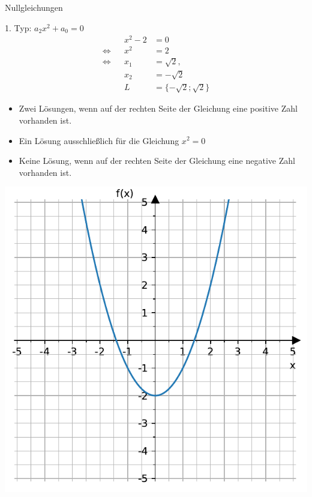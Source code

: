 \documentclass[
  ignorenonframetext,
  aspectratio=169,
]{beamer}
\providecommand{\tightlist}{%
  \setlength{\itemsep}{0pt}\setlength{\parskip}{0pt}}\usepackage{longtable,booktabs,array}
\begin{document}
\begin{frame}
\begin{block}{Nullgleichungen}
\label{nullgleichungen}
\begin{block}{1. Typ: \(a_2x^2+a_0= 0\)}
\label{typ-a_2x2a_0-0}
\[ \begin{aligned}
&& x^2-2 &= 0\\
\Leftrightarrow && x^2 &= 2\\
\Leftrightarrow && x_1 &= \sqrt{2},\\
 && x_2 &=-\sqrt{2}\\
 && L &= \{-\sqrt{2}; \sqrt{2} \}
\end{aligned}
\]

\begin{itemize}
\tightlist
\item
  Zwei Lösungen, wenn auf der rechten Seite der Gleichung eine positive
  Zahl vorhanden ist.
\item
  Ein Lösung ausschließlich für die Gleichung \(x^2=0\)
\item
  Keine Lösung, wenn auf der rechten Seite der Gleichung eine negative
  Zahl vorhanden ist.
\end{itemize}
\end{block}
\end{block}
\end{frame}

\begin{frame}
\includegraphics{3_Gleichungen_files/figure-beamer/cell-2-output-1.pdf}
\end{frame}
\end{document}
